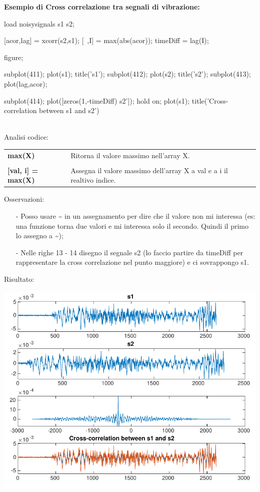 \documentclass[a4paper, 10pt]{report}
\begin{document}
\noindent \textbf{Esempio di Cross correlazione tra segnali di vibrazione:}

\begin{code}
load noisysignals s1 s2;  %

[acor,lag] = xcorr(s2,s1);
[~,I] = max(abs(acor));  %
timeDiff = lag(I);   %
      
figure;

subplot(411); plot(s1); title('s1');
subplot(412); plot(s2); title('s2');
subplot(413); plot(lag,acor);

subplot(414); plot([zeros(1,-timeDiff) s2']);
hold on; plot(s1);
title('Cross-correlation between s1 and s2')
\end{code}

\noindent \\Analisi codice:
\begin{longtable}{| p{} | p{} |}

\textbf{max(X)} & Ritorna il valore massimo nell'array X.
\\\\
\textbf{[val, i] = max(X)} & Assegna il valore massimo dell'array X a val e a i il realtivo indice.
\\

\end{longtable}

\noindent Osservazioni:
\begin{itemize}
\item[-] Posso usare \textasciitilde \hspace{0.1cm} in un assegnamento per dire che il valore non mi interessa (es: una funzione torna due valori e mi interessa solo il secondo. Quindi il primo lo assegno a \textasciitilde);
\item[-] Nelle righe 13 - 14 disegno il segnale s2 (lo faccio partire da timeDiff per rappresentare la cross correlazione nel punto maggiore) e ci sovrappongo s1.
\end{itemize}

\noindent Risultato:
\begin{center}
\includegraphics[scale=1]{es3.pdf}
\end{center}
\end{document}
